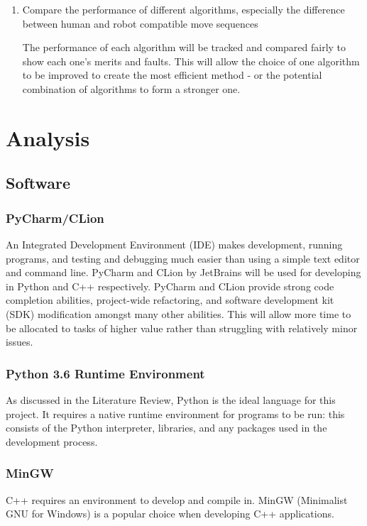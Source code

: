 \documentclass{report}
\begin{document}
\begin{enumerate}
    	\item Compare the performance of different algorithms, especially the difference between human and robot compatible move sequences \par The performance of each algorithm will be tracked and compared fairly to show each one's merits and faults. This will allow the choice of one algorithm to be improved to create the most efficient method - or the potential combination of algorithms to form a stronger one.
    \end{enumerate}
    
    \section{Analysis}
    \subsection{Software}
    
    \subsubsection{PyCharm/CLion}
    An Integrated Development Environment (IDE) makes development, running programs, and testing and debugging much easier than using a simple text editor and command line. PyCharm and CLion by JetBrains \cite{JetBrains} will be used for developing in Python and C++ respectively. PyCharm and CLion provide strong code completion abilities, project-wide refactoring, and software development kit (SDK) modification amongst many other abilities. This will allow more time to be allocated to tasks of higher value rather than struggling with relatively minor issues.
    
	\subsubsection{Python 3.6 Runtime Environment}
    As discussed in the Literature Review, Python is the ideal language for this project. It requires a native runtime environment for programs to be run: this consists of the Python interpreter, libraries, and any packages used in the development process.
    
    \subsubsection{MinGW}
    C++ requires an environment to develop and compile in. MinGW (Minimalist GNU for Windows) is a popular choice when developing C++ applications. %
    
\end{document}
